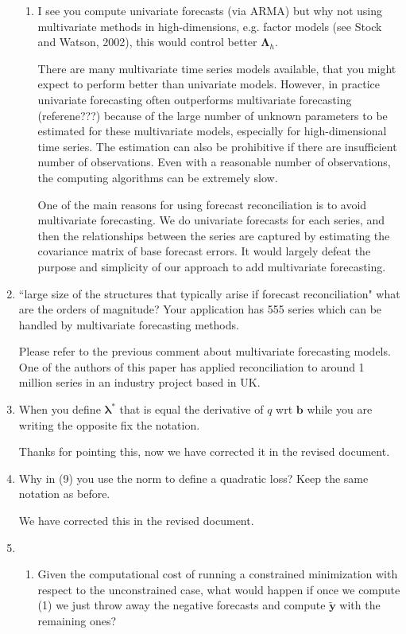 \documentclass[10pt,a4paper]{article}
\begin{document}
\begin{enumerate}
\begin{enumerate}
  \item
    I see you compute univariate forecasts (via ARMA) but why not using multivariate methods in high-dimensions, e.g. factor models (see Stock and Watson, 2002), this would control better $\bm{\Lambda}_h$.

    {\color{blue} There are many multivariate time series models available, that you might expect to perform better than univariate models. However, in practice univariate forecasting often outperforms multivariate forecasting (referene???) because of the large number of unknown parameters to be estimated for these multivariate models, especially for high-dimensional time series. The estimation can also be prohibitive if there are insufficient number of observations. Even with a reasonable number of observations, the computing algorithms can be extremely slow.

    One of the main reasons for using forecast reconciliation is to avoid multivariate forecasting. We do univariate forecasts for each series, and then the relationships between the series are captured by estimating the covariance matrix of base forecast errors. It would largely defeat the purpose and simplicity of our approach to add multivariate forecasting.}
  \end{enumerate}

\item
  ``large size of the structures that typically arise if forecast reconciliation" what are the orders of magnitude? Your application has 555 series which can be handled by multivariate forecasting methods.

  {\color{blue} Please refer to the previous comment about multivariate forecasting models. One of the authors of this paper has applied reconciliation to around 1 million series in an industry project based in UK.}

\item
  When you define $\bm{\lambda}^*$ that is equal the derivative of $q$ wrt $\bm{b}$ while you are writing the opposite fix the notation.

  {\color{blue} Thanks for pointing this, now we have corrected it in the revised document.}

\item
  Why in (9) you use the norm to define a quadratic loss? Keep the same notation as before.

  {\color{blue} We have corrected this in the revised document.}

\item
  \begin{enumerate}
  \item
    Given the computational cost of running a constrained minimization with respect to the unconstrained case, what would happen if once we compute (1) we just throw away the negative forecasts and compute $\tilde{\bm{y}}$ with the remaining ones?


\end{enumerate}
\end{enumerate}
\end{document}
